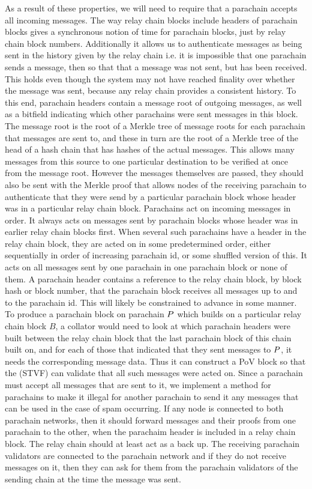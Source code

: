 As a result of these properties, we will need to require that a parachain accepts all incoming messages.
The way relay chain blocks include headers of parachain blocks gives a synchronous notion of time for parachain blocks,
just by relay chain block numbers. Additionally it allows us to authenticate messages as being sent in the history given by the relay chain
i.e. it is impossible that one parachain sends a message, then  so that that a message was not sent, but has been received. This holds even though the system may not have reached finality over whether the message was sent, because any relay chain provides a consistent history.
To this end, parachain headers contain a message root of outgoing messages, as well as a bitfield indicating which other parachains were sent messages in this block.
The message root is the root of a Merkle tree of message roots for each parachain that messages are sent to,
and these in turn are the root of a Merkle tree of the head of a hash chain that has hashes of the actual messages. This allows many messages from this source to one particular destination  to be verified at once from the message root.
However the messages themselves are passed, they should also be sent with the Merkle proof that allows nodes of the receiving parachain
to authenticate that they were send by a particular parachain block whose header was in a particular relay chain block. Parachains act on incoming messages in order. It always acts on messages sent by parachain blocks whose header was in earlier relay chain blocks first. When several such parachains have a header in the relay chain block, they are acted on in some predetermined order, either sequentially in order of increasing parachain id, or some shuffled version of this. It acts on all messages sent by one parachain in one parachain block or none of them. A parachain header contains a reference to the relay chain block, by block hash or block number, that the parachain block receives all messages up to and to the parachain id.
This will likely be constrained to advance in some manner. To produce a parachain block on parachain $P$ which builds on a particular relay chain block $B$,
a collator would need to look at which parachain headers were built between the relay chain block that the last parachain block of this chain built on,
and for each of those that indicated that they sent messages to $P$, it needs the corresponding message data.
Thus it can construct a PoV block so that the (STVF) can validate that all such messages were acted on. Since a parachain must accept all messages that are sent to it,
we implement a method for parachains to make it illegal for another parachain to send it any messages that can be used in the case of spam occurring. If any node is connected to both parachain networks, then it should forward messages and their proofs from one parachain to the other,
when the parachaim header is included in a relay chain block. The relay chain should at least act as a back up.
The receiving parachain validators are connected to the parachain network and if they do not receive messages on it, then they can ask for them from the parachain validators of the sending chain at the time the message was sent.

